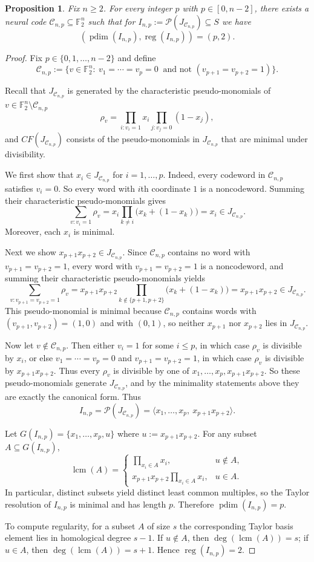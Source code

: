 \documentclass[12pt]{amsart}
\newtheorem{proposition}[theorem]{Proposition}
\theoremstyle{remark}
\theoremstyle{definition}
\DeclareMathOperator{\reg}{reg}
\DeclareMathOperator{\lcm}{lcm}
\DeclareMathOperator{\pd}{pdim}
\newcommand{\F}{\mathbb{F}}
\newcommand{\C}{\mathcal{C}}
\def\P{{\mathcal P}}
\begin{document}
\begin{proposition}\label{prop:reg2-line-realize-pd}
Fix $n\ge 2$. For every integer $p$ with $p \in [0, n-2]$, there exists a neural code
$\C_{n,p}\subseteq \F_2^n$ such that for $I_{n,p}:=\P(J_{\C_{n,p}})\subseteq
S$ we have
\[
(\pd(I_{n,p}),\reg(I_{n,p}))=(p,2).
\]
\end{proposition}

\begin{proof}
Fix $p\in\{0,1,\dots,n-2\}$ and define
\[
\C_{n,p}:=\{ v\in\F_2^n:\ v_1=\cdots=v_p=0\ \text{ and not }(v_{p+1}=v_{p+2}=1) \}.
\]

Recall that $J_{\C_{n,p}}$ is generated by the characteristic pseudo-monomials of $v\in \F_2^n\setminus \C_{n,p}$
\[
\rho_v  =  \prod_{i:v_i=1} x_i\prod_{j:v_j=0}(1-x_j),
\]
and $CF(J_{\C_{n,p}})$ consists of the pseudo-monomials in $J_{\C_{n,p}}$ that are minimal under divisibility.

We first show that $x_i\in J_{\C_{n,p}}$ for $i=1,\dots,p$. Indeed, every codeword in $\C_{n,p}$ satisfies $v_i=0$. So every word with $i$th coordinate $1$ is a noncodeword. Summing their characteristic pseudo-monomials gives
\[
\sum_{v:  v_i=1}\rho_v
 = 
x_i\prod_{k\neq i}\bigl(x_k+(1-x_k)\bigr)
 = x_i\in J_{\C_{n,p}}.
\]
Moreover, each $x_i$ is minimal.

Next we show $x_{p+1}x_{p+2}\in J_{\C_{n,p}}$. Since $\C_{n,p}$ contains no word with $v_{p+1}=v_{p+2}=1$,
every word with $v_{p+1}=v_{p+2}=1$ is a noncodeword, and summing their characteristic pseudo-monomials yields
\[
\sum_{v:  v_{p+1}=v_{p+2}=1}\rho_v
=
x_{p+1}x_{p+2}\prod_{k\notin\{p+1,p+2\}}\bigl(x_k+(1-x_k)\bigr)
=
x_{p+1}x_{p+2}\in J_{\C_{n,p}}.
\]
This pseudo-monomial is minimal because $\C_{n,p}$ contains words with $(v_{p+1},v_{p+2})=(1,0)$ and with $(0,1)$,
so neither $x_{p+1}$ nor $x_{p+2}$ lies in $J_{\C_{n,p}}$.

Now let $v\notin \C_{n,p}$. Then either $v_i=1$ for some $i\le p$, in which case $\rho_v$ is divisible by $x_i$,
or else $v_1=\cdots=v_p=0$ and $v_{p+1}=v_{p+2}=1$, in which case $\rho_v$ is divisible by $x_{p+1}x_{p+2}$.
Thus every $\rho_v$ is divisible by one of $x_1,\dots,x_p,x_{p+1}x_{p+2}$. So these pseudo-monomials generate $J_{\C_{n,p}}$, and by the
minimality statements above they are exactly the canonical form. Thus
\[
I_{n,p}=\P(J_{\C_{n,p}})=\bigl\langle x_1,\dots,x_p,\ x_{p+1}x_{p+2}\bigr\rangle.
\]


Let $G(I_{n,p})=\{x_1,\dots,x_p,u\}$ where $u:=x_{p+1}x_{p+2}$. For any subset $A\subseteq G(I_{n,p})$,
\[
\lcm(A)=
\begin{cases}
\prod_{x_i\in A} x_i , & u\notin A,\\[4pt]
x_{p+1}x_{p+2}\prod_{x_i\in A} x_i, & u\in A.
\end{cases}
\]
In particular, distinct subsets yield distinct least common multiples, so the Taylor resolution of $I_{n,p}$
is minimal and has length $p$. Therefore
$\pd(I_{n,p})=p$.

To compute regularity, for a subset $A$ of size $s$ the corresponding Taylor basis element lies in homological
degree $s-1$. If $u\notin A$, then $\deg(\lcm(A))=s$; if $u\in A$, then
$\deg(\lcm(A))=s+1$. Hence $\reg(I_{n,p})=2$.
\end{proof}
\end{document}
